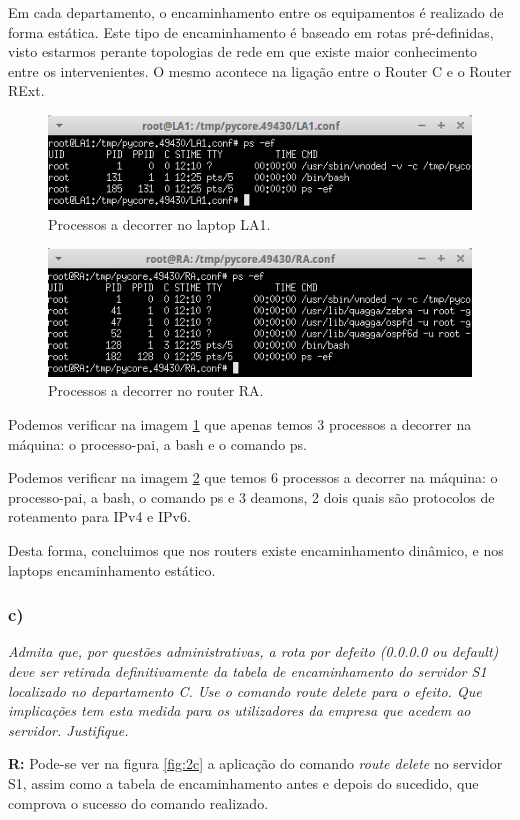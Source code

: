 \documentclass{llncs}
\begin{document}
Em cada departamento, o encaminhamento entre os equipamentos é realizado de forma estática. Este tipo de encaminhamento é baseado em rotas pré-definidas, visto estarmos perante topologias de rede em que existe maior conhecimento entre os intervenientes. O mesmo acontece na ligação entre o Router C e o Router RExt.

\begin{figure}[H]
\begin{center}
\includegraphics[scale=0.60]{2b1.png} 
\end{center}
\caption{\label{fig:2b1} Processos a decorrer no laptop LA1.}
\end{figure}

\begin{figure}[H]
\begin{center}
\includegraphics[scale=0.60]{2b2.png} 
\end{center}
\caption{\label{fig:2b2} Processos a decorrer no router RA.}
\end{figure}

Podemos verificar na imagem \ref{fig:2b1} que apenas temos 3 processos a decorrer na
máquina: o processo-pai, a bash e o comando ps.

Podemos verificar na imagem \ref{fig:2b2} que temos 6 processos a decorrer na
máquina: o processo-pai, a bash, o comando ps e 3 deamons, 2 dois quais são protocolos
de roteamento para IPv4 e IPv6.

Desta forma, concluimos que nos routers existe encaminhamento dinâmico, e nos laptops
encaminhamento estático.

\subsubsection{c)}
\emph{Admita que, por questões administrativas, a rota por defeito (0.0.0.0 ou default) deve ser retirada definitivamente da tabela de encaminhamento do servidor S1 localizado  no departamento C. Use o comando route delete para o efeito. Que  implicações  tem  esta  medida  para  os utilizadores da empresa que acedem ao servidor. Justifique.}
\\ \par
\textbf{R:} Pode-se ver na figura \ref{fig:2c} a aplicação do comando \emph{route delete} no servidor S1, assim como a tabela de encaminhamento antes e depois do sucedido, que comprova o sucesso do comando realizado.
\end{document}
